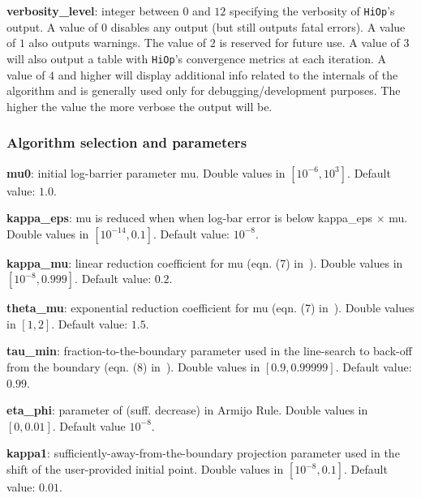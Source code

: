 \documentclass[11pt]{article}
\newcounter{line}
\newcommand{\Hi}{\texttt{HiOp}\xspace}
\begin{document}
\noindent \textbf{verbosity\_level}: integer between $0$ and $12$ specifying the verbosity of \Hi's output. A value of $0$ disables any output (but still outputs fatal errors). A value of $1$ also outputs warnings. The value of $2$ is reserved for future use. A value of $3$ will also output a table with \Hi's convergence metrics at each iteration. A value of $4$ and higher will display additional info related to the internals of the algorithm and is generally used only for debugging/development purposes. The higher the value the more verbose the output will be.

\subsubsection{Algorithm selection and parameters}

\noindent \textbf{mu0}: initial log-barrier parameter mu. Double values in $[10^{-6},10^3]$. Default value: $1.0$. 

\medskip


\noindent \textbf{kappa\_eps}: mu is reduced when when log-bar error is below kappa\_eps $\times$ mu. Double values in $[10^{-14},0.1]$. Default value: $10^{-8}$. 

\medskip


\noindent \textbf{kappa\_mu}: linear reduction coefficient for mu (eqn. (7) in~\cite{waecther_05_ipopt0}). Double values in $[10^{-8},0.999]$. Default value: $0.2$.  

\medskip


\noindent \textbf{theta\_mu}: exponential reduction coefficient for mu (eqn. (7) in~\cite{waecther_05_ipopt0}). Double values in $[1, 2]$. Default value: $1.5$.

\medskip


\noindent \textbf{tau\_min}: fraction-to-the-boundary parameter used in the line-search to back-off from the boundary (eqn. (8) in~\cite{waecther_05_ipopt0}). Double values in $[0.9, 0.99999]$. Default value: $0.99$. 

\medskip

\noindent \textbf{eta\_phi}: parameter of (suff. decrease) in Armijo Rule. Double values in $[ 0, 0.01]$. Default value $10^{-8}$.

\medskip


\noindent \textbf{kappa1}: sufficiently-away-from-the-boundary projection parameter used in the shift of the user-provided initial point. Double values in $[10^{-8},0.1]$. Default value: $0.01$. 
\end{document}

